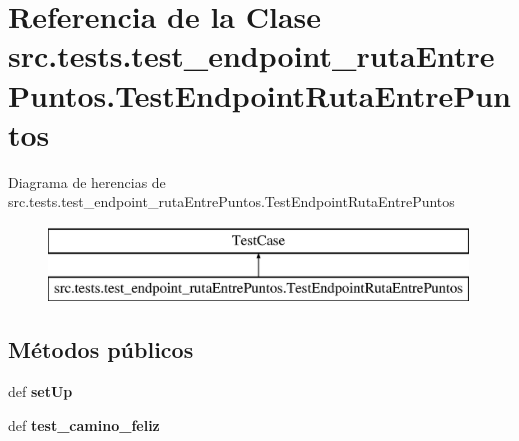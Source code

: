\hypertarget{classsrc_1_1tests_1_1test__endpoint__ruta_entre_puntos_1_1_test_endpoint_ruta_entre_puntos}{\section{Referencia de la Clase src.\-tests.\-test\-\_\-endpoint\-\_\-ruta\-Entre\-Puntos.\-Test\-Endpoint\-Ruta\-Entre\-Puntos}
\label{classsrc_1_1tests_1_1test__endpoint__ruta_entre_puntos_1_1_test_endpoint_ruta_entre_puntos}
}
Diagrama de herencias de src.\-tests.\-test\-\_\-endpoint\-\_\-ruta\-Entre\-Puntos.\-Test\-Endpoint\-Ruta\-Entre\-Puntos\begin{figure}[H]
\begin{center}
\leavevmode
\includegraphics[height=2.000000cm]{classsrc_1_1tests_1_1test__endpoint__ruta_entre_puntos_1_1_test_endpoint_ruta_entre_puntos}
\end{center}
\end{figure}
\subsection*{Métodos públicos}
\begin{DoxyCompactItemize}
\item 
\hypertarget{classsrc_1_1tests_1_1test__endpoint__ruta_entre_puntos_1_1_test_endpoint_ruta_entre_puntos_a25230405ded946314297f7c1ca348db7}{def {\bfseries set\-Up}}\label{classsrc_1_1tests_1_1test__endpoint__ruta_entre_puntos_1_1_test_endpoint_ruta_entre_puntos_a25230405ded946314297f7c1ca348db7}

\item 
\hypertarget{classsrc_1_1tests_1_1test__endpoint__ruta_entre_puntos_1_1_test_endpoint_ruta_entre_puntos_a38ec7b698d6b24ec501186a9b6e55ae4}{def {\bfseries test\-\_\-camino\-\_\-feliz}}\label{classsrc_1_1tests_1_1test__endpoint__ruta_entre_puntos_1_1_test_endpoint_ruta_entre_puntos_a38ec7b698d6b24ec501186a9b6e55ae4}

\end{DoxyCompactItemize}
